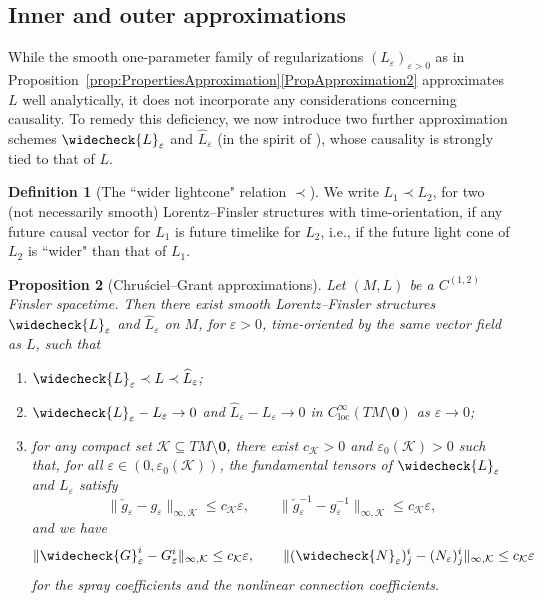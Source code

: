 \documentclass[a4paper,11pt]{article}
\numberwithin{equation}{section}
\theoremstyle{definition}
\newtheorem{Definition}{Definition}[section]
\theoremstyle{plain}
\newtheorem{Proposition}[Definition]{Proposition}
\newcommand{\eps}{\varepsilon}
\newcommand{\loc}{\mathrm{loc}}
\begin{document}
\subsection{Inner and outer approximations}\label{ssc:L_e^}

While the smooth one-parameter family of regularizations $(L_\eps)_{\eps>0}$ as in Proposition~\ref{prop:PropertiesApproximation}\ref{PropApproximation2} approximates $L$ well analytically, it does not incorporate any considerations concerning causality. To remedy this deficiency, we now introduce two further approximation schemes $\widecheck{L}_\varepsilon$ and $\widehat{L}_\varepsilon$ (in the spirit of \cite{ChruscielGrant,Graf-SingularityC1}), whose causality is strongly tied to that of $L$. 

\begin{Definition}[The ``wider lightcone" relation $\prec$]
\label{df:order}
We write $L_1 \prec L_2$, for two (not necessarily smooth) Lorentz--Finsler structures with time-orientation, if any future causal vector for $L_1$ is future timelike for $L_2$, i.e., if the future light cone of $L_2$ is ``wider" than that of $L_1$.    
\end{Definition}


\begin{Proposition}[Chru{\'s}ciel--Grant approximations]\label{prop:ChruscielGrantApprox}
Let $(M,L)$ be a $C^{(1,2)}$ Finsler spacetime.
Then there exist smooth Lorentz--Finsler structures $\widecheck{L}_\varepsilon$ and $\widehat{L}_\varepsilon$ on $M$, for $\eps>0$, time-oriented by the same vector field as $L$, such that
\begin{enumerate}
    \item \label{CG1}
    $\widecheck{L}_\varepsilon \prec L \prec \widehat{L}_\varepsilon$;
    \item \label{CG2}
    $\widecheck{L}_\varepsilon - L_\varepsilon \to 0$ and $\widehat{L}_\varepsilon - L_\varepsilon \to 0$ in $C^\infty_{\loc}(TM \setminus \mathbf 0)$ as $\eps \to 0$;
    \item \label{CG3}
    for any compact set $\mathcal{K} \subseteq TM \setminus \mathbf{0}$, there exist $c_{\mathcal{K}} >0$ and $\eps_0(\mathcal{K})>0$ such that, for all $\eps \in (0,\eps_0(\mathcal{K}))$, the fundamental tensors of $\widecheck{L}_\varepsilon$ and $L_\varepsilon$ satisfy
    \begin{equation}\label{eq:EstimatesInverseMetric}
        \| \check{g}_\eps- g_\eps \|_{\infty,\mathcal{K}} \leq c_{\mathcal{K}} \eps, \qquad \| \check{g}_\eps^{-1} - g_\eps^{-1} \|_{\infty,\mathcal{K}} \leq c_{\mathcal{K}} \eps,
    \end{equation}
    and we have
    \begin{equation}\label{eq:EstimatesCheckSpray}
        \| \widecheck{G}_{\eps}^{i} - G_\eps^{i} \|_{\infty, \mathcal{K}} \leq c_\mathcal{K} \eps, \qquad \| (\widecheck{N}_{\eps})^{i}_j - (N_\eps)^{i}_j \|_{\infty, \mathcal{K}} \leq c_\mathcal{K} \eps
    \end{equation}
    for the spray coefficients and the nonlinear connection coefficients.
\end{enumerate}
\end{Proposition}
\end{document}
